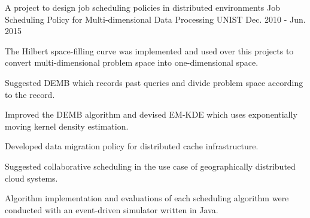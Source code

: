 \begin{cventries}

\cventry
{A project to design job scheduling policies in distributed environments} %
{Job Scheduling Policy for Multi-dimensional Data Processing} %
{UNIST} %
{Dec. 2010 - Jun. 2015} %
{ %
\begin{cvitems}
\item {The Hilbert space-filling curve was implemented and used over this projects
to convert multi-dimensional problem space into \newline one-dimensional space.}
\item {Suggested DEMB which records past queries and divide problem space according to the record.}
\item {Improved the DEMB algorithm and devised EM-KDE which uses exponentially moving kernel density
estimation.}
\item {Developed data migration policy for distributed cache infrastructure.}
\item {Suggested collaborative scheduling in the use case of geographically distributed
cloud systems.}
\item {Algorithm implementation and evaluations of each scheduling algorithm were conducted
with an event-driven simulator written \newline in Java.}
\end{cvitems}
}


\end{cventries}
